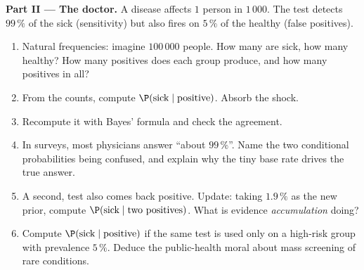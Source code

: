 \begin{problem}
\medskip
\noindent\textbf{Part II --- The doctor.}
A disease affects $1$ person in $1\,000$. The test detects
$99\,\%$ of the sick (sensitivity) but also fires on $5\,\%$ of
the healthy (false positives).
\begin{enumerate}[resume]
  \item Natural frequencies: imagine $100\,000$ people. How
        many are sick, how many healthy? How many positives
        does each group produce, and how many positives in
        all?
  \item From the counts, compute
        $\P(\text{sick} \mid \text{positive})$. Absorb the
        shock.
  \item Recompute it with Bayes' formula and check the
        agreement.
  \item In surveys, most physicians answer ``about
        $99\,\%$''. Name the two conditional probabilities
        being confused, and explain why the tiny base rate
        drives the true answer.
  \item A second,  test also comes back positive.
        Update: taking $1.9\,\%$ as the new prior, compute
        $\P(\text{sick} \mid \text{two positives})$. What is
        evidence \emph{accumulation} doing?
  \item Compute $\P(\text{sick} \mid \text{positive})$ if the
        same test is used only on a high-risk group with
        prevalence $5\,\%$. Deduce the public-health moral
        about mass screening of rare conditions.
\end{enumerate}


\end{problem}

